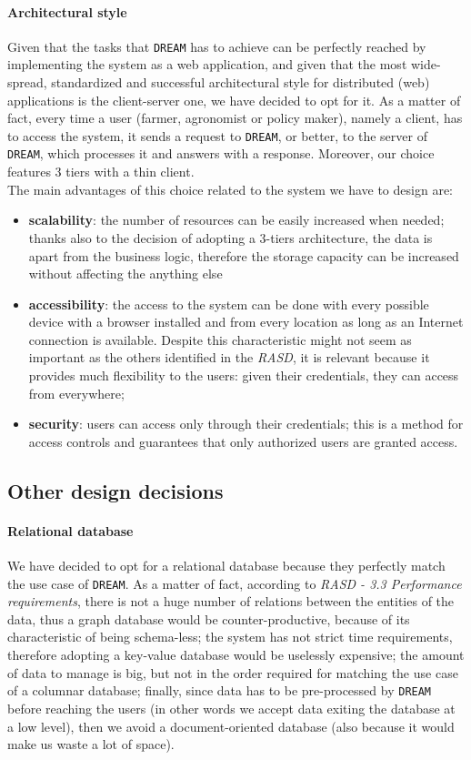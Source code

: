 \documentclass{article}
\begin{document}
\paragraph{Architectural style}
Given that the tasks that \verb|DREAM| has to achieve can be perfectly reached by implementing the system as a web application, and given that the most wide-spread, standardized and successful architectural style for distributed (web) applications is the client-server one, we have decided to opt for it. As a matter of fact, every time a user (farmer, agronomist or policy maker), namely a client, has to access the system, it sends a request to \verb|DREAM|, or better, to the server of \verb|DREAM|, which processes it and answers with a response. Moreover, our choice features 3 tiers with a thin client.\\
The main advantages of this choice related to the system we have to design are:
\begin{itemize}
    \item \textbf{scalability}: the number of resources can be easily increased when needed; thanks also to the decision of adopting a 3-tiers architecture, the data is apart from the business logic, therefore the storage capacity can be increased without affecting the anything else
    \item \textbf{accessibility}: the access to the system can be done with every possible device with a browser installed and from every location as long as an Internet connection is available. Despite this characteristic might not seem as important as the others identified in the \textit{RASD}, it is relevant because it provides much flexibility to the users: given their credentials, they can access from everywhere;
    \item \textbf{security}: users can access only through their credentials; this is a method for access controls and guarantees that only authorized users are granted access.
\end{itemize}
\subsection{Other design decisions}
\paragraph{Relational database}
We have decided to opt for a relational database because they perfectly match the use case of \verb|DREAM|. As a matter of fact, according to \textit{RASD - 3.3 Performance requirements}, there is not a huge number of relations between the entities of the data, thus a graph database would be counter-productive, because of its characteristic of being schema-less; the system has not strict time requirements, therefore adopting a key-value database would be uselessly expensive; the amount of data to manage is big, but not in the order required for matching the use case of a columnar database; finally, since data has to be pre-processed by \verb|DREAM| before reaching the users (in other words we accept data exiting the database at a low level), then we avoid a document-oriented database (also because it would make us waste a lot of space).
\end{document}
